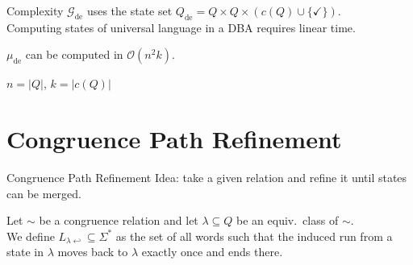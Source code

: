 \begin{frame}{Complexity}
	$\mathcal{G}_\text{de}$ uses the state set $Q_\text{de} = Q \times Q \times (c(Q) \cup \{\checkmark\})$. \\
	Computing states of universal language in a DBA requires linear time.
	
	\vspace{.5cm}
	
	\begin{theorem}
		$\mu_\text{de}$ can be computed in $\mathcal{O}(n^2 k)$.
	\end{theorem}
	\small{$n = |Q|$, $k = |c(Q)|$}
\end{frame}





\section{Congruence Path Refinement}
\begin{frame}{Congruence Path Refinement}
	Idea: take a given relation and refine it until states can be merged.
	
	\vspace{1cm}

	\begin{defn}
	Let $\sim$ be a congruence relation and let $\lambda \subseteq Q$ be an equiv.\ class of $\sim$. \\
	We define $L_{\lambda \hookleftarrow} \subseteq \Sigma^*$ as the set of all words such that the induced run from a state in $\lambda$ moves back to $\lambda$ exactly once and ends there. 
	\end{defn}
\end{frame}	


